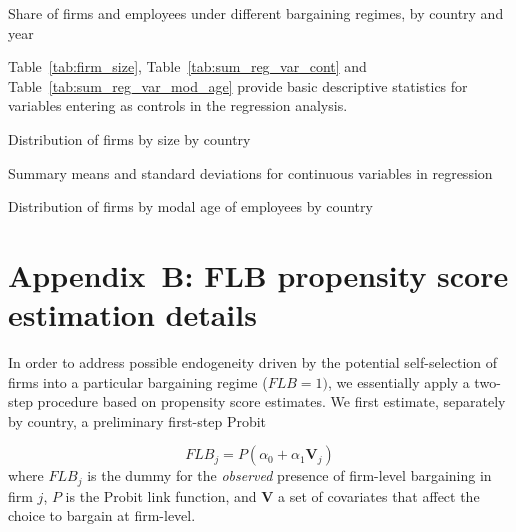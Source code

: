 \documentclass[12pt]{article}
\begin{document}
\begin{table}[hbp]
\centering
\caption{Share of firms and employees under different bargaining regimes, by country and year}
\label{tab:summary_stats}

\end{table}

\bigskip

Table~\ref{tab:firm_size}, Table~\ref{tab:sum_reg_var_cont} and Table~\ref{tab:sum_reg_var_mod_age} provide basic descriptive statistics for variables entering as controls in the regression analysis.

\begin{table}[ht]
\centering
\small
\caption{Distribution of firms by size by country}
\label{tab:firm_size}

\end{table}

\begin{table}[htp]
\caption{Summary means and standard deviations for continuous variables in regression}
\label{tab:sum_reg_var_cont}
\centering
\small

\end{table}

\begin{table}[ht]
\caption{Distribution of firms by modal age of employees by country}
\label{tab:sum_reg_var_mod_age}
\centering
\small

\end{table}


\clearpage

\section*{Appendix~B: FLB propensity score estimation details}

In order to address possible endogeneity driven by the potential self-selection of firms into a particular bargaining regime ($\mathit{FLB}=1)$, we essentially apply a two-step procedure based on propensity score estimates. We first estimate, separately by country, a preliminary first-step Probit

\begin{equation}
\label{eq:reg_propensity}
  \mathit{FLB}_j = \mathit{P}\left( \alpha_0 + \alpha_1\bm{V}_j \right)
\end{equation}
where $\mathit{FLB}_j$ is the dummy for the \emph{observed} presence of firm-level bargaining in firm $j$, $\mathit{P}$ is the Probit link function, and $\bm{V}$ a set of covariates that affect the choice to bargain at firm-level.
\end{document}
